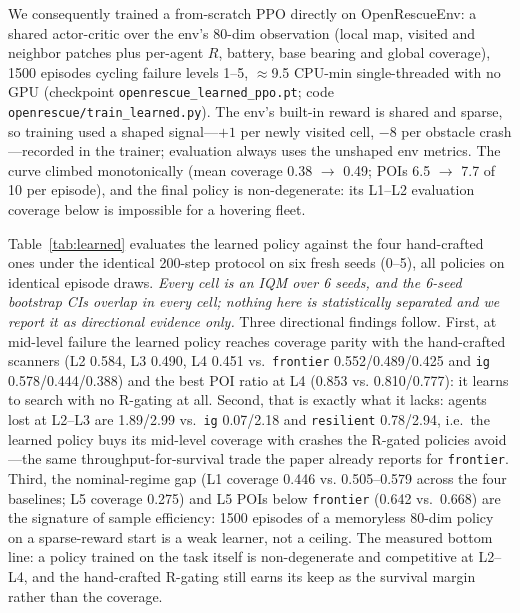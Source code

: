 \documentclass[12pt,a4paper]{article}
\begin{document}
We consequently trained a from-scratch PPO directly on OpenRescueEnv: a
shared actor-critic over the env's 80-dim observation (local map, visited
and neighbor patches plus per-agent $R$, battery, base bearing and global
coverage), 1500 episodes cycling failure levels 1--5, $\approx$9.5 CPU-min
single-threaded with no GPU (checkpoint
\texttt{openrescue\_learned\_ppo.pt}; code
\texttt{openrescue/train\_learned.py}). The env's built-in reward is shared
and sparse, so training used a shaped signal---$+1$ per newly visited cell,
$-8$ per obstacle crash---recorded in the trainer; evaluation always uses the
unshaped env metrics. The curve climbed monotonically (mean coverage
0.38 $\to$ 0.49; POIs 6.5 $\to$ 7.7 of 10 per episode), and the final policy
is non-degenerate: its L1--L2 evaluation coverage below is impossible for a
hovering fleet.

Table~\ref{tab:learned} evaluates the learned policy against the four
hand-crafted ones under the identical 200-step protocol on six fresh seeds
(0--5), all policies on identical episode draws. \emph{Every cell is an IQM
over 6 seeds, and the 6-seed bootstrap CIs overlap in every cell; nothing
here is statistically separated and we report it as directional evidence
only.} Three directional findings follow. First, at mid-level failure the
learned policy reaches coverage parity with the hand-crafted scanners (L2
0.584, L3 0.490, L4 0.451 vs.~\texttt{frontier} 0.552/0.489/0.425 and
\texttt{ig} 0.578/0.444/0.388) and the best POI ratio at L4 (0.853 vs.
0.810/0.777): it learns to search with no R-gating at all. Second, that is
exactly what it lacks: agents lost at L2--L3 are 1.89/2.99 vs.~\texttt{ig}
0.07/2.18 and \texttt{resilient} 0.78/2.94, i.e.~the learned policy buys its
mid-level coverage with crashes the R-gated policies avoid---the same
throughput-for-survival trade the paper already reports for
\texttt{frontier}. Third, the nominal-regime gap (L1 coverage 0.446 vs.
0.505--0.579 across the four baselines; L5 coverage 0.275) and L5 POIs below
\texttt{frontier} (0.642 vs.~0.668) are the signature of sample efficiency:
1500 episodes of a memoryless 80-dim policy on a sparse-reward start is a
weak learner, not a ceiling. The measured bottom line: a policy trained on
the task itself is non-degenerate and competitive at L2--L4, and the
hand-crafted R-gating still earns its keep as the survival margin rather
than the coverage.
\end{document}
